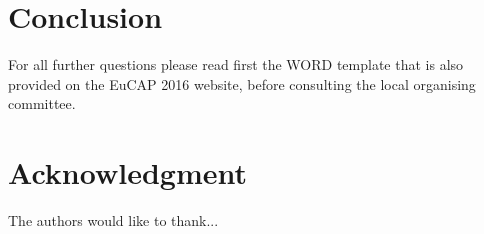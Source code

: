 \documentclass[conference,a4paper]{IEEEtran}
\begin{document}
%




\vspace{7pt}
\section{Conclusion}
For all further questions please read first the WORD template that is also provided on the EuCAP 2016 website, before consulting the local organising committee.






\vspace{7pt}
\section*{Acknowledgment}


The authors would like to thank...
\end{document}
